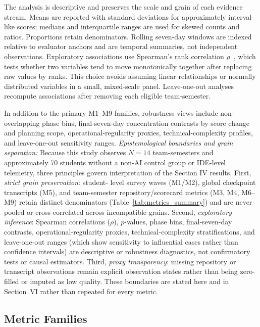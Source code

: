 The analysis is descriptive and preserves the scale and grain of each evidence
stream. Means are reported with standard deviations for approximately
interval-like scores; medians and interquartile ranges are used for skewed
counts and ratios. Proportions retain denominators. Rolling seven-day windows
are indexed relative to evaluator anchors and are temporal summaries, not
independent observations. Exploratory associations use Spearman's rank
correlation $\rho$~\cite{spearman1904proof}, which tests whether two variables
tend to move monotonically together after replacing raw values by ranks. This
choice avoids assuming linear relationships or normally distributed variables
in a small, mixed-scale panel. Leave-one-out analyses recompute associations
after removing each eligible team-semester.

In addition to the primary M1--M9 families, robustness views include
non-overlapping phase bins, final-seven-day concentration contrasts by score
change and planning scope, operational-regularity proxies,
technical-complexity profiles, and leave-one-out sensitivity ranges.
\textit{Epistemological boundaries and grain separation:} Because this study
observes $N=14$ team-semesters and approximately 70 students without a non-AI
control group or IDE-level telemetry, three principles govern interpretation
of the Section IV results. First, \textit{strict grain preservation}: student-
level survey waves (M1/M2), global checkpoint transcripts (M5), and
team-semester repository/scorecard metrics (M3, M4, M6--M9) retain distinct
denominators (Table~\ref{tab:metrics_summary}) and are never pooled or
cross-correlated across incompatible grains. Second, \textit{exploratory
inference}: Spearman correlations ($\rho$), $p$-values, phase bins,
final-seven-day contrasts, operational-regularity proxies,
technical-complexity stratifications, and leave-one-out ranges (which show
sensitivity to influential cases rather than confidence intervals) are
descriptive or robustness diagnostics, not confirmatory tests or causal
estimators. Third,
\textit{proxy transparency}: missing repository or transcript observations
remain explicit observation states rather than being zero-filled or imputed as
low quality. These boundaries are stated here and in Section~VI rather than
repeated for every metric.

\subsection{Metric Families}

